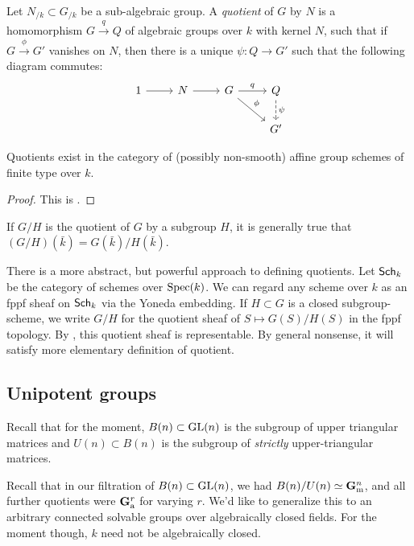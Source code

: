 \begin{definition}
Let $N_{/k}\subset G_{/k}$ be a sub-algebraic group. A \emph{quotient} of $G$ 
by $N$ is a homomorphism $G\xrightarrow q Q$ of algebraic groups over $k$ with kernel $N$, 
such that if $G\xrightarrow\phi G'$ vanishes on $N$, then there is a unique 
$\psi:Q\to G'$ such that the following diagram commutes:
\[\begin{tikzcd}
  1 \ar[r] 
    & N \ar[r] 
    & G \ar[r, "q"] \ar[dr, "\phi"]
    & Q \ar[d, "\psi", dashrightarrow] \\
  & & & G'
\end{tikzcd}\]
\end{definition}

\begin{theorem}
Quotients exist in the category of (possibly non-smooth) affine group schemes 
of finite type over $k$. 
\end{theorem}
\begin{proof}
This is \cite[10.16]{milne-iAG}. 
\end{proof}

If $G/H$ is the quotient of $G$ by a subgroup $H$, it is generally true that 
$(G/H)(\bar k)=G(\bar k)/H(\bar k)$. 

\begin{hard}
There is a more abstract, but powerful approach to defining quotients. 
Let $\mathsf{Sch}_{k}$ be the category of schemes over $\operatorname{Spec}(k)$. We can regard 
any scheme over $k$ as an fppf sheaf on $\mathsf{Sch}_{k}$ via the Yoneda embedding. 
If $H\subset G$ is a closed subgroup-scheme, we write $G/H$ for the quotient 
sheaf of $S\mapsto G(S)/H(S)$ in the fppf topology. By 
\cite[VI\textsubscript{A} 3.2]{sga3-i}, this quotient sheaf is representable. 
By general nonsense, it will satisfy more elementary definition of quotient. 
\end{hard}





\subsection{Unipotent groups}

Recall that for the moment, $B(n)\subset \operatorname{GL}(n)$ is the subgroup of upper 
triangular matrices and $U(n)\subset B(n)$ is the subgroup of \emph{strictly} 
upper-triangular matrices. 

Recall that in our filtration of $B(n)\subset \operatorname{GL}(n)$, we had 
$B(n)/U(n)\simeq \mathbf{G}_\mathrm{m}^n$, and all further quotients were $\mathbf{G}_\mathrm{a}^r$ for varying 
$r$. We'd like to generalize this to an arbitrary connected solvable groups 
over algebraically closed fields. For the moment though, $k$ need not be 
algebraically closed. 

